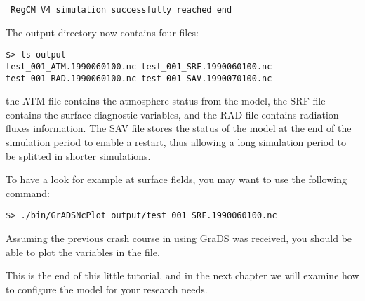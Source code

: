 \begin{Verbatim}
 RegCM V4 simulation successfully reached end
\end{Verbatim}

The output directory now contains four files:

\begin{Verbatim}
$> ls output
test_001_ATM.1990060100.nc test_001_SRF.1990060100.nc
test_001_RAD.1990060100.nc test_001_SAV.1990070100.nc
\end{Verbatim}

the ATM file contains the atmosphere status from the model, the SRF file
contains the surface diagnostic variables, and the RAD file contains radiation
fluxes information. The SAV file stores the status of the model at the end of
the simulation period to enable a restart, thus allowing a long simulation
period to be splitted in shorter simulations.

To have a look for example at surface fields, you may want to use the
following command:

\begin{Verbatim}
$> ./bin/GrADSNcPlot output/test_001_SRF.1990060100.nc
\end{Verbatim}

Assuming the previous crash course in using GraDS was received, you should be
able to plot the variables in the file.

This is the end of this little tutorial, and in the next chapter we will
examine how to configure the model for your research needs.

